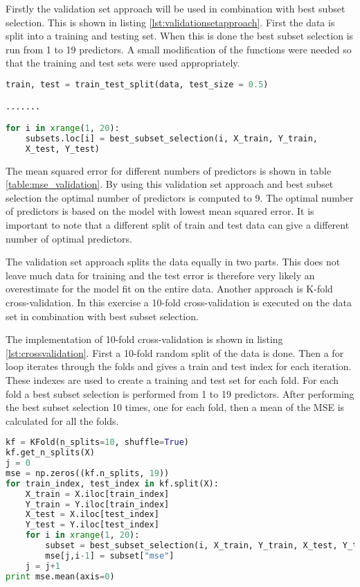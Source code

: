 Firstly the validation set approach will be used in combination with best subset selection. This is shown in listing \ref{lst:validationsetapproach}. First the data is split into a training and testing set. When this is done the best subset selection is run from 1 to 19 predictors. A small modification of the functions were needed so that the training and test sets were used appropriately.

\begin{lstlisting}[language=Python, label=lst:validationsetapproach, caption=Validation set approach and best subset selection for choosing predictors]
train, test = train_test_split(data, test_size = 0.5)

.......

for i in xrange(1, 20):
	subsets.loc[i] = best_subset_selection(i, X_train, Y_train,
	X_test, Y_test)
\end{lstlisting}

The mean squared error for different numbers of predictors is shown in table \ref{table:mse_validation}. By using this validation set approach and best subset selection the optimal number of predictors is computed to 9. The optimal number of predictors is based on the model with lowest mean squared error. It is important to note that a different split of train and test data can give a different number of optimal predictors.

The validation set approach splits the data equally in two parts. This does not leave much data for training and the test error is therefore very likely an overestimate for the model fit on the entire data. Another approach is K-fold cross-validation. In this exercise a 10-fold cross-validation is executed on the data set in combination with best subset selection.

The implementation of 10-fold cross-validation is shown in listing \ref{lst:crossvalidation}. First a 10-fold random split of the data is done. Then a for loop iterates through the folds and gives a train and test index for each iteration. These indexes are used to create a training and test set for each fold. For each fold a best subset selection is performed from 1 to 19 predictors. After performing the best subset selection 10 times, one for each fold, then a mean of the MSE is calculated for all the folds.

\begin{lstlisting}[language=Python, label=lst:crossvalidation, caption=Cross-validation and best subset selection for choosing predictors]
kf = KFold(n_splits=10, shuffle=True)
kf.get_n_splits(X)
j = 0
mse = np.zeros((kf.n_splits, 19))
for train_index, test_index in kf.split(X):
    X_train = X.iloc[train_index]
    Y_train = Y.iloc[train_index]
    X_test = X.iloc[test_index]
    Y_test = Y.iloc[test_index]
    for i in xrange(1, 20):
		subset = best_subset_selection(i, X_train, Y_train, X_test, Y_test)
        mse[j,i-1] = subset["mse"]
    j = j+1
print mse.mean(axis=0)    
\end{lstlisting}


